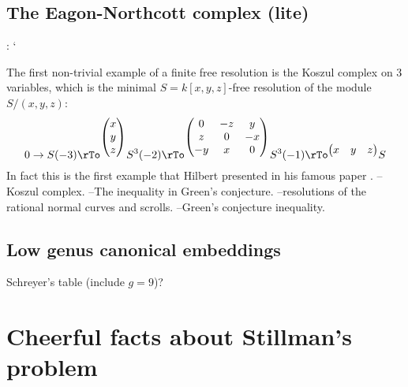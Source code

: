 \subsection{The Eagon-Northcott complex (lite)}:  `	

The first non-trivial example of a finite free resolution is the Koszul complex on 3 variables, which is the minimal $S = k[x,y,z]$-free resolution of the module $S/(x,y,z)$:
$$
0\to S(-3) \rTo^{
\begin{pmatrix}
x\\y\\z 
\end{pmatrix}}
 S^3(-2) \rTo^{\begin{pmatrix}
0&-z&y\\
z&0&-x\\
-y&x &0
\end{pmatrix}}
S^3(-1) \rTo^{
\begin{pmatrix}
x&y&z
\end{pmatrix}}
S
$$
In fact this is the first example that Hilbert presented in his famous paper \cite{}. 																											
--Koszul complex.
--The inequality in Green's conjecture.
--resolutions of the rational normal curves and scrolls.
--Green's conjecture inequality.

\subsection{Low genus canonical embeddings} Schreyer's table (include $g=9$)?

\section{Cheerful facts about Stillman's problem}

